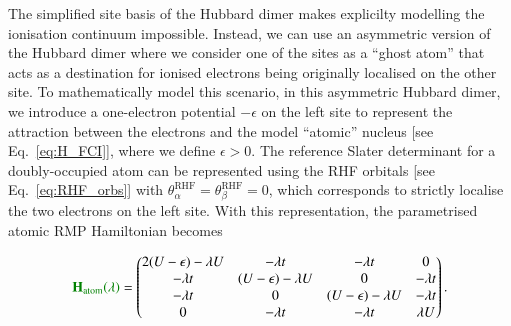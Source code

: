 \documentclass[aps,prb,reprint,noshowkeys,superscriptaddress]{revtex4-1}
\newcommand{\hugh}[1]{\textcolor{hughgreen}{#1}}
\newcommand{\bH}{\mathbf{H}}
\begin{document}
The simplified site basis of the Hubbard dimer makes explicilty modelling the ionisation continuum impossible.
Instead, we can use an asymmetric version of the Hubbard dimer \cite{Carrascal_2015,Carrascal_2018} 
where we consider one of the sites as a ``ghost atom'' that acts as a 
destination for ionised electrons being originally localised on the other site.
To mathematically model this scenario, in this asymmetric Hubbard dimer, we introduce a one-electron potential $-\epsilon$ on the left site to 
represent the attraction between the electrons and the model ``atomic'' nucleus [see Eq.~\eqref{eq:H_FCI}], where we define $\epsilon > 0$.
The reference Slater determinant for a doubly-occupied atom can be represented using the RHF
orbitals [see Eq.~\eqref{eq:RHF_orbs}] with $\theta_{\alpha}^{\text{RHF}} = \theta_{\beta}^{\text{RHF}} = 0$, which corresponds to strictly localise the two electrons on the left site.
With this representation, the parametrised \hugh{atomic} RMP Hamiltonian becomes
\begin{widetext}
\begin{equation}
\label{eq:H_RMP}
\hugh{\bH_\text{atom}\qty(\lambda)} = 
\begin{pmatrix}
    2(U-\epsilon) - \lambda U &	-\lambda t				 &	-\lambda t	            &	0	        \\
    -\lambda t				  &	(U-\epsilon) - \lambda U &	0		                &	-\lambda t	\\
    -\lambda t				  &	0			             &	(U-\epsilon) -\lambda U	&	-\lambda t	\\
    0 				          &	-\lambda t 	 			 &	-\lambda t              &	\lambda U	\\
\end{pmatrix}.
\end{equation}
\end{widetext}
\end{document}
